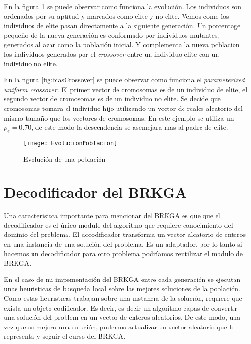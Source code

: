 \bigskip

En la figura \ref{fig:evolucion} se puede observar como funciona la evolución. Los individuos son ordenados por su aptitud y marcados como elite y no-elite. Vemos como los individuos de elite pasan directamente a la siguiente generación. Un porcentage pequeño de la nueva generación es conformado por individuos mutantes, generados al azar como la población inicial. Y complementa la nueva poblacion los individuos generados por el \textit{crossover} entre un individuo elite con un individuo no elite. 

\bigskip

En la figura \ref{fig:biasCrossover} se puede observar como funciona el \textit{parameterized uniform crossover}. El primer vector de cromosomas es de un individuo de elite, el segundo vector de cromosomas es de un individuo no elite. Se decide que cromosomas tomara el individuo hijo utilizando un vector de reales aleatorio del mismo tamaño que los vectores de cromosomas. En este ejemplo se utiliza un $\rho_e = 0.70$, de este modo la descendencia se asemejara mas al padre de elite.

\begin{figure}[h]
	\caption{Evolución de una población}
	\centering
	\texttt{[image: EvolucionPoblacion]}
	\label{fig:evolucion}
\end{figure}

\section{Decodificador del BRKGA}

Una caracterisitca importante para mencionar del BRKGA es que que el decodificador es el único modulo del algoritmo que requiere conocimiento del dominio del problema. El decodificador transforma un vector aleatorio de enteros en una instancia de una solución del problema. Es un adaptador, por lo tanto si hacemos un decodificador para otro problema podríamos reutilizar el modulo de BRKGA.

\bigskip

En el caso de mi impementación del BRKGA entre cada generación se ejecutan unas heuristicas de busqueda local sobre las mejores soluciones de la población. Como estas heuristicas trabajan sobre una instancia de la solución, requiere que exista un objeto codificador. Es decir, es decir un algoritmo capas de convertir una solución del problem en un vector de enteros aleatorios. De este modo, una vez que se mejora una solución, podemos actualizar su vector aleatorio que lo representa y seguir el curso del BRKGA. 


